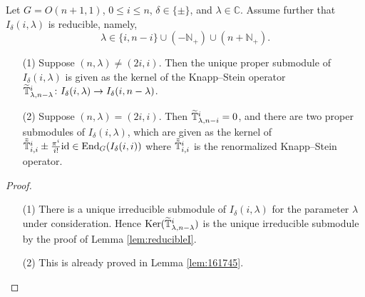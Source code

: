 \begin{proposition}
\label{prop:KerKnSt}
Let $G=O(n+1,1)$, 
 $0 \le i \le n$, 
 $\delta \in \{\pm\}$, 
and $\lambda \in {\mathbb{C}}$.  
Assume further that $I_{\delta}(i,\lambda)$ is reducible,
 namely,
\[
  \lambda \in \{i,n-i\} \cup (-{\mathbb{N}}_+) \cup (n+{\mathbb{N}}_+).  
\]
\begin{enumerate}
\item[{\rm{(1)}}]
Suppose $(n,\lambda) \ne (2i,i)$.  
Then the unique proper submodule
 of $I_{\delta}(i,\lambda)$ is given 
 as the kernel of the Knapp--Stein operator
 $\widetilde{{\mathbb{T}}}_{{\lambda},{n-\lambda}}^{{i}} \colon I_{\delta}(i,\lambda) \to I_{\delta}(i,n-\lambda)$.  
\item[{\rm{(2)}}]
Suppose $(n,\lambda) = (2i,i)$.  
Then $\widetilde{{\mathbb{T}}}_{{\lambda},{n-i}}^{{i}} =0$, 
 and there are two proper submodules
 of $I_{\delta}(i,\lambda)$, 
 which are given 
 as the kernel of
 $\tilde{\tilde{{\mathbb{T}}}}_{{i},{i}}^{{i}} \pm \frac{\pi^i}{i!} {\operatorname{id}}
 \in {\operatorname{End}}_{G} (I_{\delta}(i,i))$
 where $\tilde{\tilde{{\mathbb{T}}}}_{{i},{i}}^{{i}}$ is the renormalized Knapp--Stein operator.  
\end{enumerate}
\end{proposition}
\begin{proof}
\begin{enumerate}
\item[(1)]
There is a unique irreducible submodule of $I_{\delta}(i,\lambda)$
 for the parameter $\lambda$
 under consideration.  
Hence ${\operatorname{Ker}} (\widetilde{{\mathbb{T}}}_{{\lambda},{n-\lambda}}^{{i}})$ 
 is the unique irreducible submodule
 by the proof 
 of Lemma \ref{lem:reducibleI}.  
\item[(2)]
This is already proved in Lemma \ref{lem:161745}.  
\end{enumerate}
\end{proof}


